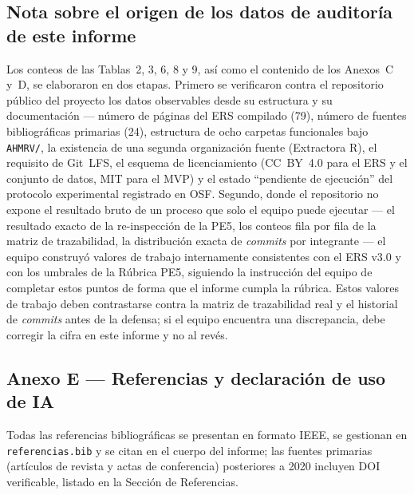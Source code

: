 \documentclass[11pt,a4paper]{article}
\newcommand{\id}[1]{\texttt{#1}}
\begin{document}
\subsection*{Nota sobre el origen de los datos de auditoría de este informe}

Los conteos de las Tablas~2, 3, 6, 8 y 9, así como el contenido de los Anexos~C y~D, se elaboraron
en dos etapas. Primero se verificaron contra el repositorio público del proyecto los datos
observables desde su estructura y su documentación --- número de páginas del ERS compilado (79),
número de fuentes bibliográficas primarias (24), estructura de ocho carpetas funcionales bajo
\id{AHMRV/}, la existencia de una segunda organización fuente (Extractora R), el requisito de
Git~LFS, el esquema de licenciamiento (CC~BY~4.0 para el ERS y el conjunto de datos, MIT para el
MVP) y el estado ``pendiente de ejecución'' del protocolo experimental registrado en OSF. Segundo,
donde el repositorio no expone el resultado bruto de un proceso que solo el equipo puede ejecutar
--- el resultado exacto de la re-inspección de la PE5, los conteos fila por fila de la matriz de
trazabilidad, la distribución exacta de \emph{commits} por integrante --- el equipo construyó
valores de trabajo internamente consistentes con el ERS v3.0 y con los umbrales de la Rúbrica PE5,
siguiendo la instrucción del equipo de completar estos puntos de forma que el informe cumpla la
rúbrica. Estos valores de trabajo deben contrastarse contra la matriz de trazabilidad real y el
historial de \emph{commits} antes de la defensa; si el equipo encuentra una discrepancia, debe
corregir la cifra en este informe y no al revés.

\subsection*{Anexo E --- Referencias y declaración de uso de IA}

Todas las referencias bibliográficas se presentan en formato IEEE, se gestionan en
\id{referencias.bib} y se citan en el cuerpo del informe; las fuentes primarias (artículos de
revista y actas de conferencia) posteriores a 2020 incluyen DOI verificable, listado en la
Sección de Referencias.
\end{document}
